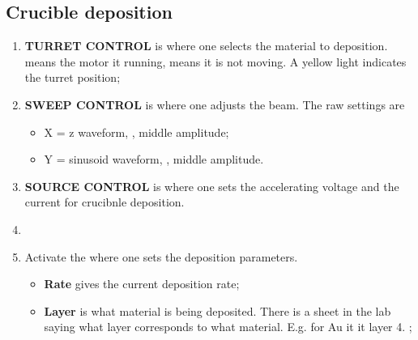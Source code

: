  \subsection{Crucible deposition}
 \begin{enumerate}
 \item \textbf{TURRET CONTROL}  is where one selects  the material to
   deposition.  means the
   motor it running,   means it is not moving.  A yellow
   light indicates the turret position;
 \item \textbf{SWEEP CONTROL} is where  one adjusts the beam. The raw
   settings are
   \begin{itemize}
   \item X = z waveform, , middle amplitude;
   \item Y = sinusoid waveform, , middle amplitude.
   \end{itemize}
 \item  \textbf{SOURCE CONTROL}  is where  one sets  the accelerating
   voltage and the current for crucibnle deposition.
 \item {}   
 \item  Activate  the  \textbf{}   where  one  sets  the
   deposition  parameters.        
   \begin{itemize}
   \item \textbf{Rate} gives the current deposition rate;
   \item \textbf{Layer} is what material is being deposited. There is
     a  sheet  in the  lab  saying  what  layer corresponds  to  what
     material.   E.g. for  Au it  it layer  4.  ;

\end{itemize}
\end{enumerate}
